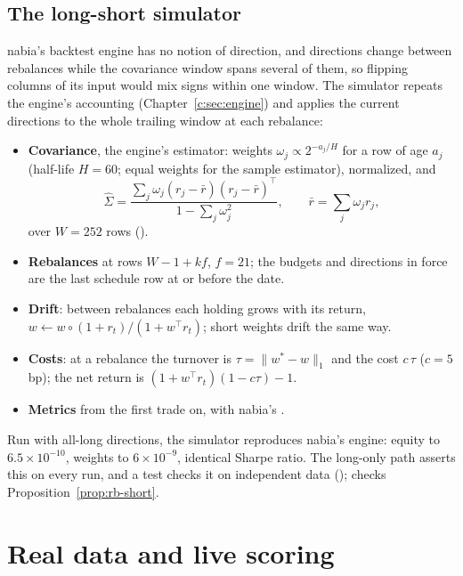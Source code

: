 \section{The long-short simulator}\label{sec:rb-simulator}
nabia's backtest engine has no notion of direction, and directions change between rebalances while the covariance
window spans several of them, so flipping columns of its input would mix signs within one window. The simulator
 repeats the engine's accounting (Chapter~\ref{c:sec:engine}) and applies the current directions to
the whole trailing window at each rebalance:
\begin{itemize}
  \item \textbf{Covariance}, the engine's estimator: weights $\omega_j\propto2^{-a_j/H}$ for a row of age $a_j$
        (half-life $H=60$; equal weights for the sample estimator), normalized, and
        \[
          \hat\Sigma=\frac{\sum_j\omega_j(r_j-\bar r)(r_j-\bar r)^\top}{1-\sum_j\omega_j^2},\qquad\bar r=\sum_j\omega_jr_j ,
        \]
        over $W=252$ rows ().
  \item \textbf{Rebalances} at rows $W-1+kf$, $f=21$; the budgets and directions in force are the last schedule row
        at or before the date.
  \item \textbf{Drift}: between rebalances each holding grows with its return,
        $w\leftarrow w\circ(1+r_t)/(1+w^\top r_t)$; short weights drift the same way.
  \item \textbf{Costs}: at a rebalance the turnover is $\tau=\|w^\ast-w\|_1$ and the cost $c\,\tau$ ($c=5$ bp); the
        net return is $(1+w^\top r_t)(1-c\tau)-1$.
  \item \textbf{Metrics} from the first trade on, with nabia's .
\end{itemize}
Run with all-long directions, the simulator reproduces nabia's engine: equity to $6.5\times10^{-10}$, weights to
$6\times10^{-9}$, identical Sharpe ratio. The long-only path asserts this on every run, and a test checks it on
independent data ();  checks Proposition~\ref{prop:rb-short}.

\chapter{Real data and live scoring}\label{ch:rb-real}

